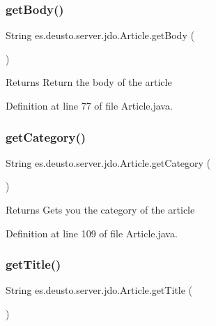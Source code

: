 \subsubsection{\texorpdfstring{get\+Body()}{getBody()}}
{\footnotesize\ttfamily String es.\+deusto.\+server.\+jdo.\+Article.\+get\+Body (\begin{DoxyParamCaption}{ }\end{DoxyParamCaption})}

\begin{DoxyReturn}{Returns}
Return the body of the article 
\end{DoxyReturn}


Definition at line 77 of file Article.\+java.

\mbox{\label{classes_1_1deusto_1_1server_1_1jdo_1_1_article_a23780eedb093f3edd43a63c17e7684e4}} 
\subsubsection{\texorpdfstring{get\+Category()}{getCategory()}}
{\footnotesize\ttfamily String es.\+deusto.\+server.\+jdo.\+Article.\+get\+Category (\begin{DoxyParamCaption}{ }\end{DoxyParamCaption})}

\begin{DoxyReturn}{Returns}
Gets you the category of the article 
\end{DoxyReturn}


Definition at line 109 of file Article.\+java.

\mbox{\label{classes_1_1deusto_1_1server_1_1jdo_1_1_article_a2b35e53280b447706cfe2ee8c8eabaac}} 
\subsubsection{\texorpdfstring{get\+Title()}{getTitle()}}
{\footnotesize\ttfamily String es.\+deusto.\+server.\+jdo.\+Article.\+get\+Title (\begin{DoxyParamCaption}{ }\end{DoxyParamCaption})}

